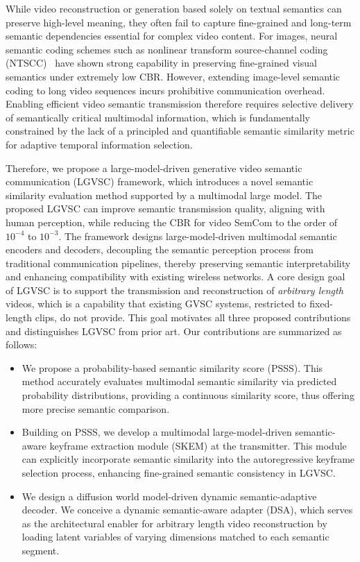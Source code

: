\documentclass[10pt,journal]{IEEEtran}
\begin{document}
While video reconstruction or generation based solely on textual semantics can preserve high-level meaning, they often fail to capture fine-grained and long-term semantic dependencies essential for complex video content. For images, neural semantic coding schemes such as nonlinear transform source-channel coding (NTSCC)~\cite{NTSCC} have shown strong capability in preserving fine-grained visual semantics under extremely low CBR. However, extending image-level semantic coding to long video sequences incurs prohibitive communication overhead. Enabling efficient video semantic transmission therefore requires selective delivery of semantically critical multimodal information, which is fundamentally constrained by the lack of a principled and quantifiable semantic similarity metric for adaptive temporal information selection.


Therefore, we propose a large-model-driven generative video semantic communication (LGVSC) framework, which introduces a novel semantic similarity evaluation method supported by a multimodal large model. The proposed LGVSC can improve semantic transmission quality, aligning with human perception, while {reducing the CBR for video SemCom to the order of $10^{-4}$ to $10^{-3}$}. The framework designs large-model-driven multimodal semantic encoders and decoders, decoupling the semantic perception process from traditional communication pipelines, thereby preserving semantic interpretability and enhancing compatibility with existing wireless networks. A core design goal of LGVSC is to support the transmission and reconstruction of \emph{arbitrary length} videos, which is a capability that existing GVSC systems, restricted to fixed-length clips, do not provide. This goal motivates all three proposed contributions and distinguishes LGVSC from prior art.
Our contributions are summarized as follows:

\begin{itemize}
  \item We propose a probability-based semantic similarity score (PSSS). This method accurately evaluates multimodal semantic similarity via predicted probability distributions, providing a continuous similarity score, thus offering more precise semantic comparison.

  \item Building on PSSS, we develop a multimodal large-model-driven semantic-aware keyframe extraction module (SKEM) at the transmitter. This module can explicitly incorporate semantic similarity into the autoregressive keyframe selection process, enhancing fine-grained semantic consistency in LGVSC.
  
  \item We design a diffusion world model-driven dynamic semantic-adaptive decoder. We conceive a dynamic semantic-aware adapter (DSA), {which serves as the architectural enabler for arbitrary length video reconstruction by loading latent variables of varying dimensions matched to each semantic segment.}
\end{itemize}
\end{document}
